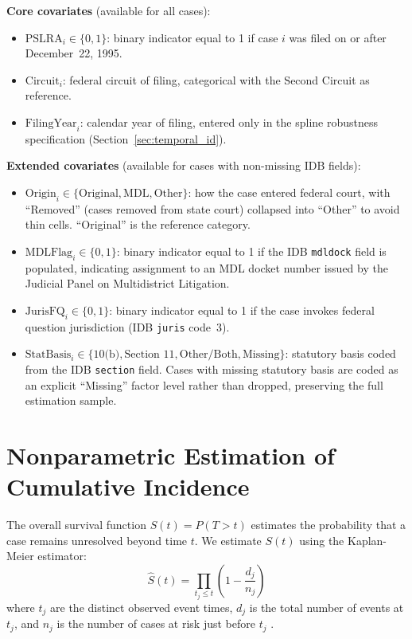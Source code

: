\textbf{Core covariates} (available for all cases):
\begin{itemize}
    \item $\text{PSLRA}_i \in \{0,1\}$: binary indicator equal
    to 1 if case $i$ was filed on or after December~22, 1995.
    \item $\text{Circuit}_i$: federal circuit of filing,
    categorical with the Second Circuit as reference.
    \item $\text{FilingYear}_i$: calendar year of filing,
    entered only in the spline robustness specification
    (Section~\ref{sec:temporal_id}).
\end{itemize}

\textbf{Extended covariates} (available for cases with
non-missing IDB fields):
\begin{itemize}
    \item $\text{Origin}_i \in \{\text{Original},
    \text{MDL}, \text{Other}\}$: how the case entered federal
    court, with ``Removed'' (cases removed from state court)
    collapsed into ``Other'' to avoid thin cells.
    ``Original'' is the reference category.
    \item $\text{MDLFlag}_i \in \{0,1\}$: binary indicator
    equal to 1 if the IDB \texttt{mdldock} field is populated,
    indicating assignment to an MDL docket number issued by
    the Judicial Panel on Multidistrict Litigation.
    \item $\text{JurisFQ}_i \in \{0,1\}$: binary indicator
    equal to 1 if the case invokes federal question
    jurisdiction (IDB \texttt{juris} code~3).
    \item $\text{StatBasis}_i \in \{\text{10(b)},
    \text{Section~11}, \text{Other/Both}, \text{Missing}\}$:
    statutory basis coded from the IDB \texttt{section} field.
    Cases with missing statutory basis are coded as an explicit
    ``Missing'' factor level rather than dropped, preserving
    the full estimation sample.
\end{itemize}

\section{Nonparametric Estimation of Cumulative Incidence}

The overall survival function $S(t) = P(T > t)$ estimates the probability that a case remains unresolved beyond time $t$. We estimate $S(t)$ using the Kaplan-Meier estimator:
\begin{equation}
\hat{S}(t) = \prod_{t_j \leq t} \left(1 - \frac{d_j}{n_j}\right)
\end{equation}
where $t_j$ are the distinct observed event times, $d_j$ is the total number of events at $t_j$, and $n_j$ is the number of cases at risk just before $t_j$ \citep{kaplan1958}.


